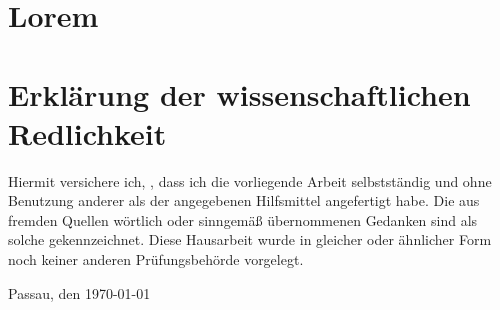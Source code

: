 \documentclass{Hausarbeit}
\begin{document}
    \section{Lorem}

    \blindtext
    
    \blindtext

    \blindtext

    \newpage

\section*{Erklärung der wissenschaftlichen Redlichkeit}

Hiermit versichere ich, \theauthor, dass ich die
vorliegende Arbeit selbstständig und ohne Benutzung anderer
als der angegebenen Hilfsmittel angefertigt habe. Die aus
fremden Quellen wörtlich oder sinngemäß übernommenen Gedanken
sind als solche gekennzeichnet. Diese Hausarbeit wurde
in gleicher oder ähnlicher Form noch keiner anderen
Prüfungsbehörde vorgelegt.

\vspace*{1cm}

Passau, den \today\\[0.5cm]
\hspace{0.5cm} \makebox[4cm]{\hrulefill}\\
\theauthor
\end{document}
